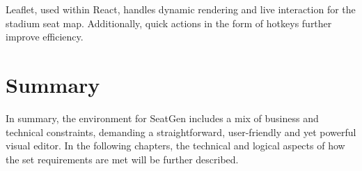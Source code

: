 Leaflet, used within React, handles dynamic rendering and live interaction for the stadium seat map. Additionally, quick actions in the form of hotkeys further improve efficiency.

\section{Summary}
In summary, the environment for SeatGen includes a mix of business and technical constraints, demanding a straightforward, user-friendly and yet powerful visual editor. In the following chapters, the technical and logical aspects of how the set requirements are met will be further described.